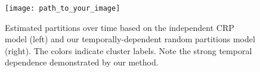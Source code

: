\documentclass{article}
\begin{document}
\begin{figure}[h]
    \centering
    \texttt{[image: path\_to\_your\_image]} %
    \caption{Estimated partitions over time based on the independent CRP model (left) and our temporally-dependent random partitions model (right). The colors indicate cluster labels. Note the strong temporal dependence demonstrated by our method.}
    \label{fig:temporal_partitions}
\end{figure}
\end{document}
